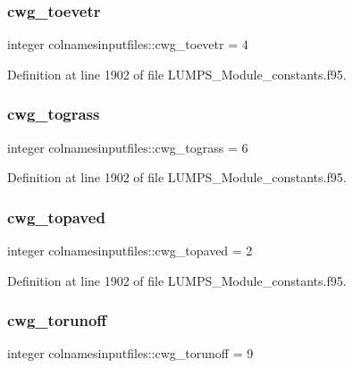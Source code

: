 \subsubsection{\texorpdfstring{cwg\+\_\+toevetr}{cwg\_toevetr}}
{\footnotesize\ttfamily integer colnamesinputfiles\+::cwg\+\_\+toevetr = 4}



Definition at line 1902 of file L\+U\+M\+P\+S\+\_\+\+Module\+\_\+constants.\+f95.

\mbox{\label{namespacecolnamesinputfiles_a26de107a7c31bec02c878c95fa12afaf}} 
\subsubsection{\texorpdfstring{cwg\+\_\+tograss}{cwg\_tograss}}
{\footnotesize\ttfamily integer colnamesinputfiles\+::cwg\+\_\+tograss = 6}



Definition at line 1902 of file L\+U\+M\+P\+S\+\_\+\+Module\+\_\+constants.\+f95.

\mbox{\label{namespacecolnamesinputfiles_a2dd0d1d55401afccfbcce4af42d45dc6}} 
\subsubsection{\texorpdfstring{cwg\+\_\+topaved}{cwg\_topaved}}
{\footnotesize\ttfamily integer colnamesinputfiles\+::cwg\+\_\+topaved = 2}



Definition at line 1902 of file L\+U\+M\+P\+S\+\_\+\+Module\+\_\+constants.\+f95.

\mbox{\label{namespacecolnamesinputfiles_acc2373562aba09ce4159c84e13cffde9}} 
\subsubsection{\texorpdfstring{cwg\+\_\+torunoff}{cwg\_torunoff}}
{\footnotesize\ttfamily integer colnamesinputfiles\+::cwg\+\_\+torunoff = 9}




